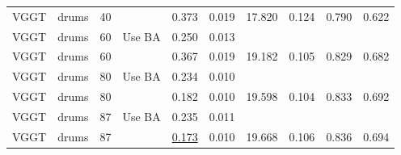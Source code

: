 \begin{table}[H]
\begin{tabular}{llrlrrrrrr}
VGGT & drums & 40 &  & 0.373 & 0.019 & 17.820 & 0.124 & 0.790 & 0.622 \\
VGGT & drums & 60 & Use BA & 0.250 & 0.013 &  &  &  &  \\
VGGT & drums & 60 &  & 0.367 & 0.019 & 19.182 & 0.105 & 0.829 & 0.682 \\
VGGT & drums & 80 & Use BA & 0.234 & 0.010 &  &  &  &  \\
VGGT & drums & 80 &  & 0.182 & 0.010 & 19.598 & 0.104 & 0.833 & 0.692 \\
VGGT & drums & 87 & Use BA & 0.235 & 0.011 &  &  &  &  \\
VGGT & drums & 87 &  & \underline{0.173} & 0.010 & 19.668 & 0.106 & 0.836 & 0.694 \\
\bottomrule
\end{tabular}
\end{table}